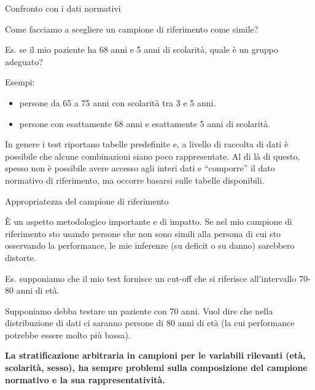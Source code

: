 \documentclass[
  ignorenonframetext,
]{beamer}
\providecommand{\tightlist}{%
  \setlength{\itemsep}{0pt}\setlength{\parskip}{0pt}}
\begin{document}
\begin{frame}{Confronto con i dati normativi}
\label{confronto-con-i-dati-normativi-2}
\small

Come facciamo a scegliere un campione di riferimento come simile?

Es. se il mio paziente ha 68 anni e 5 anni di scolarità, quale è un
gruppo adeguato?

Esempi:

\begin{itemize}
\tightlist
\item
  persone da 65 a 75 anni con scolarità tra 3 e 5 anni.
\item
  persone con esattamente 68 anni e esattamente 5 anni di scolarità.
\end{itemize}

In genere i test riportano tabelle predefinite e, a livello di raccolta
di dati è possibile che alcune combinazioni siano poco rappresentate. Al
di là di questo, spesso non è possibile avere accesso agli interi dati e
``comporre'' il dato normativo di riferimento, ma occorre basarsi sulle
tabelle disponibili.
\end{frame}

\begin{frame}{Appropriatezza del campione di riferimento}
\label{appropriatezza-del-campione-di-riferimento}
\small

È un aspetto metodologico importante e di impatto. Se nel mio campione
di riferimento sto usando persone che non sono simili alla persona di
cui sto osservando la performance, le mie inferenze (su deficit o su
danno) sarebbero distorte.

Es. supponiamo che il mio test fornisce un cut-off che si riferisce
all'intervallo 70-80 anni di età.

Supponiamo debba testare un paziente con 70 anni. Vuol dire che nella
distribuzione di dati ci saranno persone di 80 anni di età (la cui
performance potrebbe essere molto più bassa).

\textbf{La stratificazione arbitraria in campioni per le variabili
rilevanti (età, scolarità, sesso), ha sempre problemi sulla composizione
del campione normativo e la sua rappresentatività.}
\end{frame}
\end{document}
